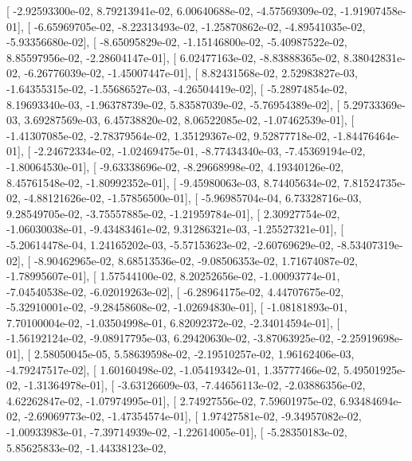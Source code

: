 \documentclass{article}
\begin{document}
       [ -2.92593300e-02,   8.79213941e-02,   6.00640688e-02,
         -4.57569309e-02,  -1.91907458e-01],
       [ -6.65969705e-02,  -8.22313493e-02,  -1.25870862e-02,
         -4.89541035e-02,  -5.93356680e-02],
       [ -8.65095829e-02,  -1.15146800e-02,  -5.40987522e-02,
          8.85597956e-02,  -2.28604147e-01],
       [  6.02477163e-02,  -8.83888365e-02,   8.38042831e-02,
         -6.26776039e-02,  -1.45007447e-01],
       [  8.82431568e-02,   2.52983827e-03,  -1.64355315e-02,
         -1.55686527e-03,  -4.26504419e-02],
       [ -5.28974854e-02,   8.19693340e-03,  -1.96378739e-02,
          5.83587039e-02,  -5.76954389e-02],
       [  5.29733369e-03,   3.69287569e-03,   6.45738820e-02,
          8.06522085e-02,  -1.07462539e-01],
       [ -1.41307085e-02,  -2.78379564e-02,   1.35129367e-02,
          9.52877718e-02,  -1.84476464e-01],
       [ -2.24672334e-02,  -1.02469475e-01,  -8.77434340e-03,
         -7.45369194e-02,  -1.80064530e-01],
       [ -9.63338696e-02,  -8.29668998e-02,   4.19340126e-02,
          8.45761548e-02,  -1.80992352e-01],
       [ -9.45980063e-03,   8.74405634e-02,   7.81524735e-02,
         -4.88121626e-02,  -1.57856500e-01],
       [ -5.96985704e-04,   6.73328716e-03,   9.28549705e-02,
         -3.75557885e-02,  -1.21959784e-01],
       [  2.30927754e-02,  -1.06030038e-01,  -9.43483461e-02,
          9.31286321e-03,  -1.25527321e-01],
       [ -5.20614478e-04,   1.24165202e-03,  -5.57153623e-02,
         -2.60769629e-02,  -8.53407319e-02],
       [ -8.90462965e-02,   8.68513536e-02,  -9.08506353e-02,
          1.71674087e-02,  -1.78995607e-01],
       [  1.57544100e-02,   8.20252656e-02,  -1.00093774e-01,
         -7.04540538e-02,  -6.02019263e-02],
       [ -6.28964175e-02,   4.44707675e-02,  -5.32910001e-02,
         -9.28458608e-02,  -1.02694830e-01],
       [ -1.08181893e-01,   7.70100004e-02,  -1.03504998e-01,
          6.82092372e-02,  -2.34014594e-01],
       [ -1.56192124e-02,  -9.08917795e-03,   6.29420630e-02,
         -3.87063925e-02,  -2.25919698e-01],
       [  2.58050045e-05,   5.58639598e-02,  -2.19510257e-02,
          1.96162406e-03,  -4.79247517e-02],
       [  1.60160498e-02,  -1.05419342e-01,   1.35777466e-02,
          5.49501925e-02,  -1.31364978e-01],
       [ -3.63126609e-03,  -7.44656113e-02,  -2.03886356e-02,
          4.62262847e-02,  -1.07974995e-01],
       [  2.74927556e-02,   7.59601975e-02,   6.93484694e-02,
         -2.69069773e-02,  -1.47354574e-01],
       [  1.97427581e-02,  -9.34957082e-02,  -1.00933983e-01,
         -7.39714939e-02,  -1.22614005e-01],
       [ -5.28350183e-02,   5.85625833e-02,  -1.44338123e-02,
\end{document}
